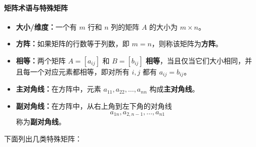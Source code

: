 \paragraph{矩阵术语与特殊矩阵}

\begin{itemize}
    \item \textbf{大小/维度：}一个有 $m$ 行和 $n$ 列的矩阵 $A$ 的大小为 $m\times n$。
    \item \textbf{方阵：}如果矩阵的行数等于列数，即 $m=n$，则称该矩阵为\textbf{方阵}。
    \item \textbf{相等：}两个矩阵 $A=[a_{ij}]$ 和 $B=[b_{ij}]$ \textbf{相等}，当且仅当它们大小相同，并且每一个对应元素都相等，即对所有 $i,j$ 都有 $a_{ij}=b_{ij}$。
    \item \textbf{主对角线：}在方阵中，元素 $a_{11},a_{22},\ldots,a_{nn}$ 构成\textbf{主对角线}。
    \item \textbf{副对角线：}在方阵中，从右上角到左下角的对角线
    $$a_{1n}, a_{2,n-1}, \ldots, a_{n1}$$
    称为\textbf{副对角线}。
\end{itemize}

下面列出几类特殊矩阵：

